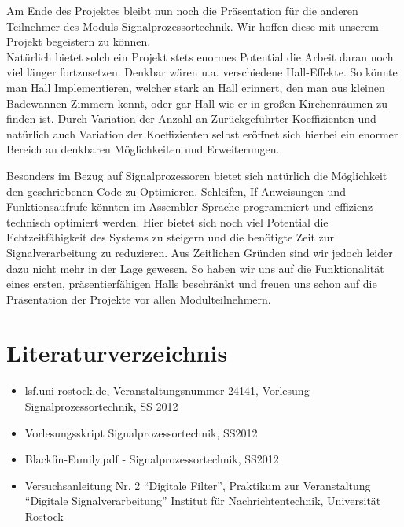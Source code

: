 \documentclass[a4paper,12pt,fontsize=12,DIV=12]{scrartcl}
\begin{document}
Am Ende des Projektes bleibt nun noch die Präsentation für die anderen Teilnehmer des Moduls Signalprozessortechnik. Wir hoffen diese mit unserem Projekt begeistern zu können.
\\

Natürlich bietet solch ein Projekt stets enormes Potential die Arbeit daran noch viel länger fortzusetzen. Denkbar wären u.a. verschiedene Hall-Effekte. So könnte man Hall Implementieren, welcher stark an Hall erinnert, den man aus kleinen Badewannen-Zimmern kennt, oder gar Hall wie er in großen Kirchenräumen zu finden ist. Durch Variation der Anzahl an Zurückgeführter Koeffizienten und natürlich auch Variation der Koeffizienten selbst eröffnet sich hierbei ein enormer Bereich an denkbaren Möglichkeiten und Erweiterungen.

Besonders im Bezug auf Signalprozessoren bietet sich natürlich die Möglichkeit den geschriebenen Code zu Optimieren. Schleifen, If-Anweisungen und Funktionsaufrufe könnten im Assembler-Sprache programmiert und effizienz-technisch optimiert werden.
Hier bietet sich noch viel Potential die Echtzeitfähigkeit des Systems zu steigern und die benötigte Zeit zur Signalverarbeitung zu reduzieren.
Aus Zeitlichen Gründen sind wir jedoch leider dazu nicht mehr in der Lage gewesen. So haben wir uns auf die Funktionalität eines ersten, präsentierfähigen Halls beschränkt und freuen uns schon auf die Präsentation der Projekte vor allen Modulteilnehmern.

\clearpage

\section{Literaturverzeichnis}
\vspace{1.5cm}
 \begin{itemize} 
\item lsf.uni-rostock.de, Veranstaltungsnummer 24141, Vorlesung Signalprozessortechnik, SS 2012
\item Vorlesungsskript Signalprozessortechnik, SS2012
\item Blackfin-Family.pdf - Signalprozessortechnik, SS2012
\item Versuchsanleitung Nr. 2 "`Digitale Filter"', Praktikum zur Veranstaltung "`Digitale Signalverarbeitung"' Institut für Nachrichtentechnik, Universität Rostock
\end{itemize}
\end{document}
